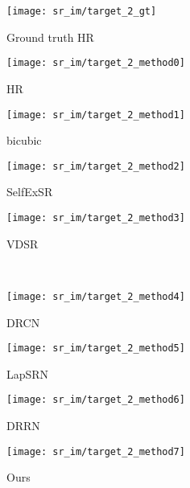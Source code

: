 \documentclass[10pt,twocolumn,letterpaper]{article}
\begin{document}
\begin{figure*}[t!]
\begin{subfigure}{.24\textwidth}
\texttt{[image: sr\_im/target\_2\_gt]}
 \captionsetup{labelformat=empty,font=scriptsize,skip=2pt}
  \caption{Ground truth HR}
\end{subfigure}\hfill
\parbox{.74\textwidth}{
\begin{subfigure}{.24\linewidth}
\texttt{[image: sr\_im/target\_2\_method0]}
\captionsetup{labelformat=empty,font=scriptsize,skip=2pt}
\caption{HR}
\end{subfigure}
\begin{subfigure}{.24\linewidth}
\texttt{[image: sr\_im/target\_2\_method1]}
\captionsetup{labelformat=empty,font=scriptsize,skip=2pt}
\caption{bicubic}
\end{subfigure}
\begin{subfigure}{.24\linewidth}
\texttt{[image: sr\_im/target\_2\_method2]}
\captionsetup{labelformat=empty,font=scriptsize,skip=2pt}
\caption{SelfExSR\cite{huang2015single}}
\end{subfigure}
\begin{subfigure}{.24\linewidth}
\texttt{[image: sr\_im/target\_2\_method3]}
\captionsetup{labelformat=empty,font=scriptsize,skip=2pt}
\caption{VDSR\cite{kim2016accurate}}
\end{subfigure}\\
\begin{subfigure}{.24\linewidth}
\texttt{[image: sr\_im/target\_2\_method4]}
\captionsetup{labelformat=empty,font=scriptsize,skip=2pt}
\caption{DRCN\cite{kim2016deeply}}
\end{subfigure}
\begin{subfigure}{.24\linewidth}
\texttt{[image: sr\_im/target\_2\_method5]}
\captionsetup{labelformat=empty,font=scriptsize,skip=2pt}
\caption{LapSRN\cite{lai2017deep}}
\end{subfigure}
\begin{subfigure}{.24\linewidth}
\texttt{[image: sr\_im/target\_2\_method6]}
\captionsetup{labelformat=empty,font=scriptsize,skip=2pt}
\caption{DRRN\cite{tai2017image}}
\end{subfigure}
\begin{subfigure}{.24\linewidth}
\texttt{[image: sr\_im/target\_2\_method7]}
\captionsetup{labelformat=empty,font=scriptsize,skip=2pt}
\caption{Ours}
\end{subfigure}}


\end{figure*}
\end{document}
